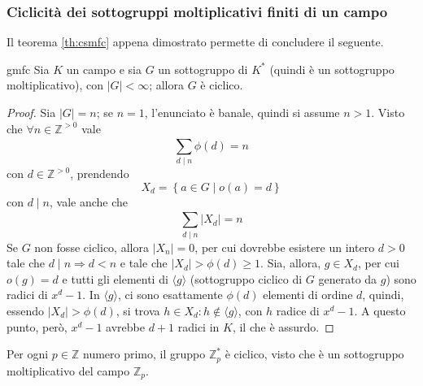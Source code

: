 \documentclass[11pt, a4paper]{scrartcl}
\theoremstyle{definition}
\numberwithin{esempio}{section}
\theoremstyle{definition}
\numberwithin{obs}{section}
\numberwithin{nota}{section}
\numberwithin{equation}{subsection}
\begin{document}
\subsubsection{Ciclicit\`a dei sottogruppi moltiplicativi finiti di un campo}
Il teorema \ref{th:csmfc} appena dimostrato permette di concludere il seguente.
\begin{teorema}
	{}{gmfc}
	Sia $K$ un campo e sia $G$ un sottogruppo di $K^*$ (quindi \`e un sottogruppo moltiplicativo), con $|G|<\infty$; allora $G$ \`e ciclico.
	\begin{proof}
		Sia $|G| = n$; se $n=1$, l'enunciato \`e banale, quindi si assume $n>1$.
		Visto che $\forall n \in \mathbb{Z}^{>0} $ vale 
		\[
		\sum_{d \mid n}^{} \phi (d) = n
		\] 
		con $d \in \mathbb{Z}^{>0} $, prendendo 
		\[
		X_d = \left\{ a \in G  \mid o(a) = d \right\} 
		\] 
	con $d  \mid n$, vale anche che
	\[
	\sum_{d \mid n}^{}  \lvert X_d \rvert =n
	\] 
	Se $G $ non fosse ciclico, allora $\lvert X_n \rvert =0$, per cui dovrebbe esistere un intero $d>0$ tale che $d  \mid n \Rightarrow  d < n$ e tale che $\lvert X_d \rvert > \phi (d) \ge 1$.
	Sia, allora, $g \in X_d$, per cui $o(g) = d$ e tutti gli elementi di $\langle g \rangle$ (sottogruppo ciclico di $G$ generato da $g$) sono radici di $x^d - 1$.
	In $\langle g \rangle$, ci sono esattamente $\phi (d)$ elementi di ordine $d$, quindi, essendo $\lvert X_d \rvert > \phi (d)$, si trova $h \in X_d : h \not \in \langle g \rangle$, con $h$ radice di $x^d - 1$. 
	A questo punto, per\`o, $x^d - 1$ avrebbe $d+1$ radici in $K$, il che \`e assurdo.
	\end{proof}
\end{teorema}
\begin{corollario}
	{}{}
	Per ogni $p \in \mathbb{Z}$ numero primo, il gruppo $\mathbb{Z}^*_p$ \`e ciclico, visto che \`e un sottogruppo moltiplicativo del campo $\mathbb{Z}_p$.
\end{corollario}
\end{document}
